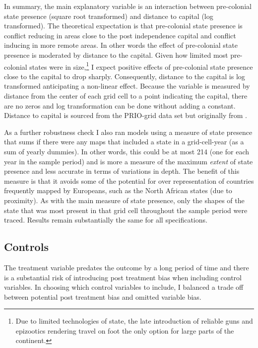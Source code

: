 \documentclass[12pt]{article}
\begin{document}
In summary, the main explanatory variable is an interaction between pre-colonial
state presence (square root transformed) and distance to capital (log
transformed). The theoretical expectation is that pre-colonial state presence is
conflict reducing in areas close to the post independence capital and conflict
inducing in more remote areas. In other words the effect of pre-colonial state
presence is moderated by distance to the capital. Given how limited most
pre-colonial states were in size,\footnote{Due to limited technologies of state,
the late introduction of reliable guns and epizootics rendering travel on foot
the only option for large parts of the continent.} I expect positive effects of
pre-colonial state presence close to the capital to drop sharply. Consequently,
distance to the capital is log transformed anticipating a non-linear effect.
Because the variable is measured by distance from the center of each grid cell
to a point indicating the capital, there are no zeros and log transformation can
be done without adding a constant. Distance to capital is sourced from the
PRIO-grid data set but originally from \citet{Weidmann2010a}.

As a further robustness check I also ran models using a measure of state
presence that sums if there were any maps that included a state in a
grid-cell-year (as a sum of yearly dummies). In other words, this could be at
most 214 (one for each year in the sample period) and is more a measure of the
maximum \textit{extent} of state presence and less accurate in terms of
variations in depth. The benefit of this measure is that it avoids some of the
potential for over representation of countries frequently mapped by Europeans,
such as the North African states (due to proximity). As with the main measure of
state presence, only the shapes of the state that was most present in that grid
cell throughout the sample period were traced. Results remain substantially the
same for all specifications.

\subsection{Controls} \label{Controls}

The treatment variable predates the outcome by a long
period of time and there is a substantial risk of introducing post treatment bias
when including control variables. In choosing which control variables to
include, I balanced a trade off between potential post treatment bias
and omitted variable bias. 
\end{document}
